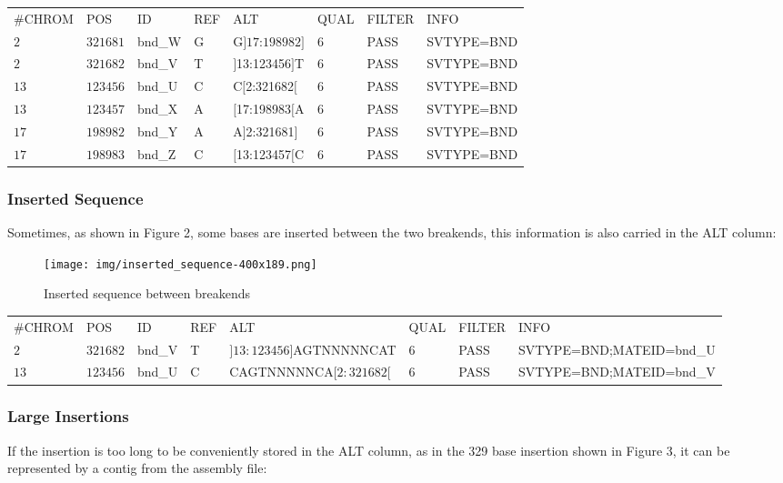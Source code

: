 \documentclass[8pt]{article}
\begin{document}
\vspace{0.3cm}
\begin{tabular}{ l l l l l l l l }
\#CHROM &POS & ID & REF & ALT & QUAL & FILTER & INFO \\
$2$ & $321681$ & bnd\_W & G & G$]17$:$198982]$ & $6$ & PASS & SVTYPE=BND \\
$2$ & $321682$ & bnd\_V & T & $]$13:123456$]$T & 6 & PASS & SVTYPE=BND \\
$13$ & $123456$ & bnd\_U & C & C$[$2:321682$[$ & 6 & PASS & SVTYPE=BND \\
$13$ & $123457$ & bnd\_X & A & $[$17:198983$[$A & 6 & PASS & SVTYPE=BND \\
$17$ & $198982$ & bnd\_Y & A & A$]$2:321681$]$ & 6 & PASS & SVTYPE=BND \\
$17$ & $198983$ & bnd\_Z & C & $[$13:123457$[$C & 6 & PASS & SVTYPE=BND \\
\end{tabular}

\subsubsection{Inserted Sequence}

Sometimes, as shown in Figure 2, some bases are inserted between the two breakends, this information is also carried in the ALT column:

\begin{figure}[h]
\centering
\texttt{[image: img/inserted\_sequence-400x189.png]}
\caption{Inserted sequence between breakends}
\end{figure}

\vspace{0.3cm}
\footnotesize
\begin{tabular}{ l l l l l l l l }
\#CHROM & POS & ID & REF & ALT & QUAL & FILTER & INFO \\
$2$ & $321682$ & bnd\_V & T & $]13:123456]$AGTNNNNNCAT & $6$ & PASS & SVTYPE=BND;MATEID=bnd\_U \\
$13$ & $123456$ & bnd\_U & C & CAGTNNNNNCA$[2:321682[$ & $6$ & PASS & SVTYPE=BND;MATEID=bnd\_V \\
\end{tabular}
\normalsize
\vspace{0.3cm}

\subsubsection{Large Insertions}
If the insertion is too long to be conveniently stored in the ALT column, as in the 329 base insertion shown in Figure 3, it can be represented by a contig from the assembly file:
\end{document}
